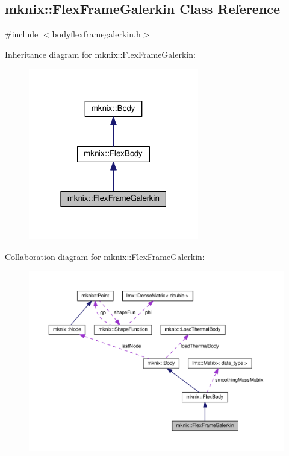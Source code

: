 \hypertarget{classmknix_1_1_flex_frame_galerkin}{}\subsection{mknix\+:\+:Flex\+Frame\+Galerkin Class Reference}
\label{classmknix_1_1_flex_frame_galerkin}


{\ttfamily \#include $<$bodyflexframegalerkin.\+h$>$}



Inheritance diagram for mknix\+:\+:Flex\+Frame\+Galerkin\+:\nopagebreak
\begin{figure}[H]
\begin{center}
\leavevmode
\includegraphics[width=211pt]{db/d72/classmknix_1_1_flex_frame_galerkin__inherit__graph}
\end{center}
\end{figure}


Collaboration diagram for mknix\+:\+:Flex\+Frame\+Galerkin\+:\nopagebreak
\begin{figure}[H]
\begin{center}
\leavevmode
\includegraphics[width=350pt]{dc/d64/classmknix_1_1_flex_frame_galerkin__coll__graph}
\end{center}
\end{figure}
